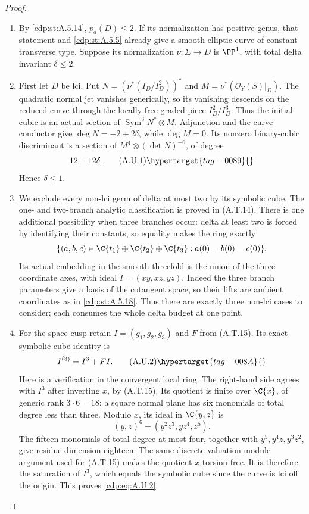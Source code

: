 \begin{proof}

\begin{enumerate}[label={$\langle1\rangle$\arabic*.},leftmargin=*]
\item By \ref{cdp:st:A.5.14}, $p_a(D)\le2$. If its normalization has
positive genus, that statement and \ref{cdp:st:A.5.5} already give
a smooth elliptic curve of constant transverse type.
Suppose its normalization $\nu:\Sigma\to D$ is
$\PP^1$, with total delta invariant $\delta\le2$.

\item First let $D$ be lci. Put
$N=(\nu^*(I_D/I_D^2))^*$ and
$M=\nu^*(\mathcal O_Y(S)|_D)$.
The quadratic normal jet vanishes generically, so
its vanishing descends on the reduced curve through
the locally free graded piece $I_D^2/I_D^3$.
Thus the initial cubic is an actual section of
$\operatorname{Sym}^3N^*\otimes M$.
Adjunction and the curve conductor give
$\deg N=-2+2\delta$, while $\deg M=0$.
Its nonzero binary-cubic discriminant is a section
of $M^4\otimes(\det N)^{-6}$, of degree
\[
                         12-12\delta.             \tag{A.U.1}\hypertarget{tag-0089}{}\label{cdp:eq:A.U.1}
\]
Hence $\delta\le1$.

\item We exclude every non-lci germ of delta at most two
by its symbolic cube. The one- and two-branch analytic
classification is proved in (A.T.14). There is one
additional possibility when three branches occur:
delta at least two is forced by identifying their
constants, so equality makes the ring exactly
\[
 \{(a,b,c)\in\C\{t_1\}\oplus\C\{t_2\}\oplus\C\{t_3\}:
                      a(0)=b(0)=c(0)\}.
\]
Its actual embedding in the smooth threefold is the
union of the three coordinate axes, with ideal
$I=(xy,xz,yz)$. Indeed the three branch parameters
give a basis of the cotangent space, so their lifts
are ambient coordinates as in \ref{cdp:st:A.5.18}.
Thus there are exactly three non-lci cases to consider;
each consumes the whole delta budget at one point.

\item For the space cusp retain $I=(g_1,g_2,g_3)$ and
$F$ from (A.T.15). Its exact symbolic-cube identity is
\[
                         I^{(3)}=I^3+FI.           \tag{A.U.2}\hypertarget{tag-008A}{}\label{cdp:eq:A.U.2}
\]
Here is a verification in the convergent local ring.
The right-hand side agrees with $I^3$ after inverting
$x$, by (A.T.15). Its quotient is finite over
$\C\{x\}$, of generic rank $3\cdot6=18$: a square
normal plane has six monomials of total degree less
than three. Modulo $x$, its ideal in $\C\{y,z\}$ is
\[
 (y,z)^6+(y^2z^3,yz^4,z^5).
\]
The fifteen monomials of total degree at most four,
together with $y^5,y^4z,y^3z^2$, give residue dimension
eighteen. The same discrete-valuation-module argument
used for (A.T.15) makes the quotient $x$-torsion-free.
It is therefore the saturation of $I^3$, which equals
the symbolic cube since the curve is lci off the origin.
This proves \eqref{cdp:eq:A.U.2}.


\end{enumerate}
\end{proof}
